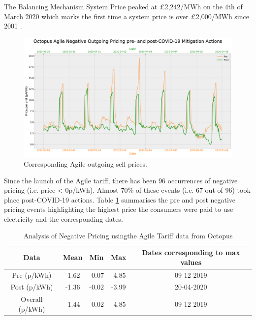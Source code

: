\documentclass[energies,article,submit,moreauthors,pdftex]{Definitions/mdpi}
\begin{document}
The Balancing Mechanism System Price peaked at £2,242/MWh on the 4th of March 2020 which marks the first time a system price is over £2,000/MWh since 2001 \cite{ELEXON2020ELEXONBMRS}. 

\begin{figure}[H]\centering
\hspace{-25pt}\includegraphics[width=15 cm]{Graphics/Pre-post_AgileOUTGO_negative_comp.pdf}
\caption{Corresponding Agile outgoing sell prices.}\label{fig:neg_agile_comp_prepost}
\end{figure}  

Since the launch of the Agile tariff, there has been 96 occurrences of negative pricing (i.e. price < 0p/kWh). Almost 70\% of these events (i.e. 67 out of 96) took place post-COVID-19 actions. Table \ref{table:neg_agile_table} summarises the pre and post negative pricing events highlighting the highest price the consumers were paid to use electricity and the corresponding dates.

\begin{table}[H]
\caption{Analysis of Negative Pricing usingthe  Agile Tariff data from Octopus \cite{AgileEnergy} }\label{table:neg_agile_table}
\centering
\begin{tabular}{ccccc }
\toprule
\textbf{Data} & \textbf{Mean}	& \textbf{Min}	& \textbf{Max}& Dates corresponding to max values\\
\midrule
Pre	(p/kWh)	& -1.62			& -0.07         & -4.85 &09-12-2019\\
Post (p/kWh) & -1.36			& -0.02         & -3.99& 20-04-2020\\
Overall (p/kWh) & -1.44			& -0.02         & -4.85 &09-12-2019\\
\bottomrule
\end{tabular}
\end{table}
\end{document}
